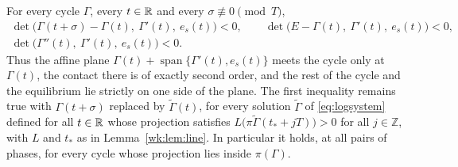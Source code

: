 \begin{theorem}\label{thm:dualsupport}
For every cycle $\Gamma$, every $t\in\mathbb R$ and every $\sigma\not\equiv0\pmod T$,
\begin{equation}\label{wk:eq:DS}
\begin{gathered}
\det\bigl(\Gamma(t+\sigma)-\Gamma(t),\ \Gamma'(t),\ e_s(t)\bigr)<0,\qquad
\det\bigl(E-\Gamma(t),\ \Gamma'(t),\ e_s(t)\bigr)<0,\\
\det\bigl(\Gamma''(t),\ \Gamma'(t),\ e_s(t)\bigr)<0 .
\end{gathered}
\end{equation}
Thus the affine plane $\Gamma(t)+\operatorname{span}\{\Gamma'(t),e_s(t)\}$ meets the cycle only at $\Gamma(t)$, the contact there is of exactly second order, and the rest of the cycle and the equilibrium lie strictly on one side of the plane. The first inequality remains true with $\Gamma(t+\sigma)$ replaced by $\tilde\Gamma(t)$, for every solution $\tilde\Gamma$ of \eqref{eq:logsystem} defined for all $t\in\mathbb R$ whose projection satisfies $L\bigl(\pi\tilde\Gamma(t_\ast+jT)\bigr)>0$ for all $j\in\mathbb Z$, with $L$ and $t_\ast$ as in Lemma~\ref{wk:lem:line}. In particular it holds, at all pairs of phases, for every cycle whose projection lies inside $\pi(\Gamma)$.
\end{theorem}
